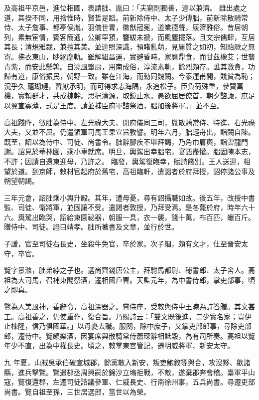 \begin{pinyinscope}
 及高祖平京邑，進位相國，表請朏、胤曰：「夫窮則獨善，達以兼濟。
 雖出處之道，其揆不同，用捨惟時，賢哲是蹈。前新除侍中、太子少傅朏，前新除散騎常侍、太子詹事、都亭侯胤，羽儀世胄，徽猷冠冕，道業德聲，康濟雅俗。昔居朝列，素無宦情，賓客簡通，公卿罕預，簪紱未褫，而風塵擺落。且文宗儒肆，互居其長；清規雅裁，兼擅其美。並達照深識，預睹亂萌，見庸質之如初，知貽厥之無寄。拂衣東山，眇絕塵軌。雖解組昌運，實避昏時。家膺鼎食，而甘茲橡艾；世襲青紫，而安此懸鶉。自澆風肇扇，用南成俗，淳流素軌，餘烈頗存。誰其激貪，功歸有道，康俗振民，朝野一致。雖在江海，而勳同魏闕。今泰運甫開，賤貧為恥；況乎久
 蘊瑚璉，暫厭承明，而可得求志海隅，永追松子。臣負荷殊重，參贊萬機，實賴群才，共成棟幹。思挹清源，取鏡止水。愚欲屈居僚首，朝夕諮諏，庶足以翼宣寡薄，式是王度。請並補臣府軍諮祭酒，朏加後將軍。」並不至。



 高祖踐阼，徵朏為侍中、左光祿大夫、開府儀同三司，胤散騎常侍、特進、右光祿大夫，又並不屈。仍遣領軍司馬王果宣旨敦譬。明年六月，朏輕舟出，詣闕自陳。既至，詔以為侍中、司徒、尚書令。朏辭腳疾不堪拜謁，乃角巾肩輿，詣雲龍門謝。詔見於華林園，乘小車就席。明旦，輿駕出幸朏宅，宴語盡懽。朏固陳本志，不許；因請自還東迎母，乃許之。
 臨發，輿駕復臨幸，賦詩餞別。王人送迎，相望於道。到京師，敕材官起府於舊宅，高祖臨軒，遣謁者於府拜授，詔停諸公事及朔望朝謁。



 三年元會，詔朏乘小輿升殿。其年，遭母憂，尋有詔攝職如故。後五年，改授中書監、司徒、衛將軍，並固讓不受。遣謁者敦授，乃拜受焉。是冬薨於府，時年六十六。輿駕出臨哭，詔給東園祕器，朝服一具，衣一襲，錢十萬，布百匹，蠟百斤。贈侍中、司徒。謚曰靖孝。朏所著書及文章，並行於世。



 子諼，官至司徒右長史，坐殺牛免官，卒於家。次子絪，頗有文才，仕至晉安太守，卒官。



 覽字景滌，朏弟綍之子也。選尚齊錢唐公主，拜駙馬都尉、秘書郎、太子舍人。高祖為大司馬，召補東閣祭酒，遷相國戶曹。天監元年，為中書侍郎，掌吏部事，頃之即真。



 覽為人美風神，善辭令，高祖深器之。嘗侍座，受敕與侍中王暕為詩答贈。其文甚工。高祖善之，仍使重作，復合旨。乃賜詩云：「雙文既後進，二少實名家；豈伊止棟隆，信乃俱國華。」以母憂去職。服闋，除中庶子，又掌吏部郎事，尋除吏部郎，遷侍中。覽頗樂酒，因宴席與散騎常侍蕭琛辭相詆毀，為有司所奏。高祖以覽年少不直，出為中權長史。頃之，敕掌東宮管記，遷明威將軍、新安太守。



 九
 年夏，山賊吳承伯破宣城郡，餘黨散入新安，叛吏鮑敘等與合，攻沒黟、歙諸縣，進兵擊覽。覽遣郡丞周興嗣於錦沙立塢拒戰，不敵，遂棄郡奔會稽。臺軍平山寇，覽復還郡，左遷司徒諮議參軍、仁威長史、行南徐州事，五兵尚書。尋遷吏部尚書。覽自祖至孫，三世居選部，當世以為榮。




\end{pinyinscope}
